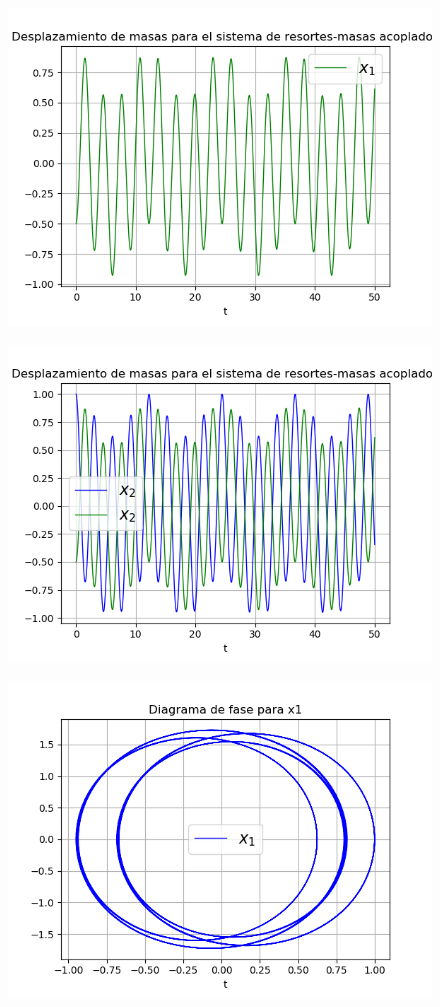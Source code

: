 \documentclass{article}
\begin{document}
\begin{figure}[H]
	\centering
    \includegraphics[width=\linewidth]{31_d2.png}
\end{figure}
\begin{figure}[H]
	\centering
    \includegraphics[width=\linewidth]{31_d12.png}
\end{figure}
\begin{figure}[H]
	\centering
    \includegraphics[width=\linewidth]{31_f1.png}
\end{figure}
\end{document}
